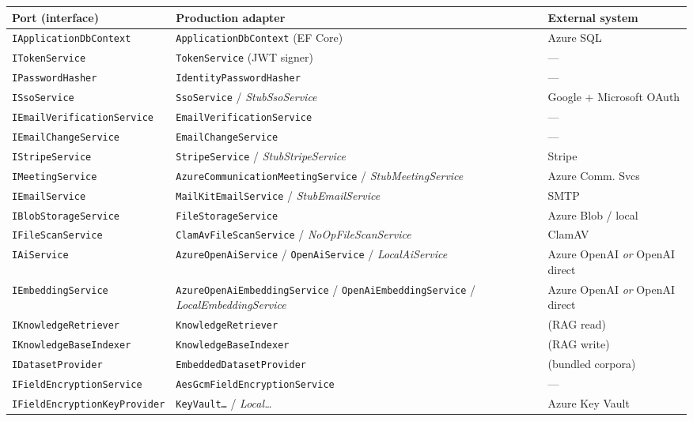 \documentclass[11pt,a4paper]{article}
\begin{document}
\begin{longtable}{@{}p{4.3cm}p{6.8cm}p{3.4cm}@{}}
\toprule
\textbf{Port (interface)} & \textbf{Production adapter} & \textbf{External system}\\
\midrule\endhead
\texttt{IApplicationDbContext} & \texttt{ApplicationDbContext} (EF Core) & Azure SQL\\
\texttt{ITokenService} & \texttt{TokenService} (JWT signer) & ---\\
\texttt{IPasswordHasher} & \texttt{IdentityPasswordHasher} & ---\\
\texttt{ISsoService} & \texttt{SsoService} / \emph{StubSsoService} & Google + Microsoft OAuth\\
\texttt{IEmailVerificationService} & \texttt{EmailVerificationService} & ---\\
\texttt{IEmailChangeService} & \texttt{EmailChangeService} & ---\\
\texttt{IStripeService} & \texttt{StripeService} / \emph{StubStripeService} & Stripe\\
\texttt{IMeetingService} & \texttt{AzureCommunicationMeetingService} / \emph{StubMeetingService} & Azure Comm. Svcs\\
\texttt{IEmailService} & \texttt{MailKitEmailService} / \emph{StubEmailService} & SMTP\\
\texttt{IBlobStorageService} & \texttt{FileStorageService} & Azure Blob / local\\
\texttt{IFileScanService} & \texttt{ClamAvFileScanService} / \emph{NoOpFileScanService} & ClamAV\\
\texttt{IAiService} & \texttt{AzureOpenAiService} / \texttt{OpenAiService} / \emph{LocalAiService} & Azure OpenAI \emph{or} OpenAI direct\\
\texttt{IEmbeddingService} & \texttt{AzureOpenAiEmbeddingService} / \texttt{OpenAiEmbeddingService} / \emph{LocalEmbeddingService} & Azure OpenAI \emph{or} OpenAI direct\\
\texttt{IKnowledgeRetriever} & \texttt{KnowledgeRetriever} & (RAG read)\\
\texttt{IKnowledgeBaseIndexer} & \texttt{KnowledgeBaseIndexer} & (RAG write)\\
\texttt{IDatasetProvider} & \texttt{EmbeddedDatasetProvider} & (bundled corpora)\\
\texttt{IFieldEncryptionService} & \texttt{AesGcmFieldEncryptionService} & ---\\
\texttt{IFieldEncryptionKeyProvider} & \texttt{KeyVault\dots} / \emph{Local\dots} & Azure Key Vault\\

\end{longtable}
\end{document}
